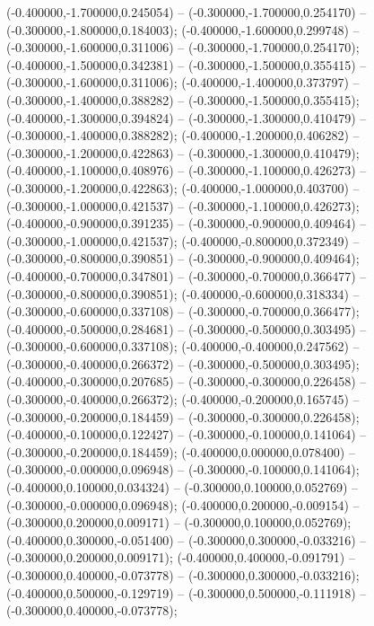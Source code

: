  (-0.400000,-1.700000,0.245054) -- (-0.300000,-1.700000,0.254170) -- (-0.300000,-1.800000,0.184003);
 (-0.400000,-1.600000,0.299748) -- (-0.300000,-1.600000,0.311006) -- (-0.300000,-1.700000,0.254170);
 (-0.400000,-1.500000,0.342381) -- (-0.300000,-1.500000,0.355415) -- (-0.300000,-1.600000,0.311006);
 (-0.400000,-1.400000,0.373797) -- (-0.300000,-1.400000,0.388282) -- (-0.300000,-1.500000,0.355415);
 (-0.400000,-1.300000,0.394824) -- (-0.300000,-1.300000,0.410479) -- (-0.300000,-1.400000,0.388282);
 (-0.400000,-1.200000,0.406282) -- (-0.300000,-1.200000,0.422863) -- (-0.300000,-1.300000,0.410479);
 (-0.400000,-1.100000,0.408976) -- (-0.300000,-1.100000,0.426273) -- (-0.300000,-1.200000,0.422863);
 (-0.400000,-1.000000,0.403700) -- (-0.300000,-1.000000,0.421537) -- (-0.300000,-1.100000,0.426273);
 (-0.400000,-0.900000,0.391235) -- (-0.300000,-0.900000,0.409464) -- (-0.300000,-1.000000,0.421537);
 (-0.400000,-0.800000,0.372349) -- (-0.300000,-0.800000,0.390851) -- (-0.300000,-0.900000,0.409464);
 (-0.400000,-0.700000,0.347801) -- (-0.300000,-0.700000,0.366477) -- (-0.300000,-0.800000,0.390851);
 (-0.400000,-0.600000,0.318334) -- (-0.300000,-0.600000,0.337108) -- (-0.300000,-0.700000,0.366477);
 (-0.400000,-0.500000,0.284681) -- (-0.300000,-0.500000,0.303495) -- (-0.300000,-0.600000,0.337108);
 (-0.400000,-0.400000,0.247562) -- (-0.300000,-0.400000,0.266372) -- (-0.300000,-0.500000,0.303495);
 (-0.400000,-0.300000,0.207685) -- (-0.300000,-0.300000,0.226458) -- (-0.300000,-0.400000,0.266372);
 (-0.400000,-0.200000,0.165745) -- (-0.300000,-0.200000,0.184459) -- (-0.300000,-0.300000,0.226458);
 (-0.400000,-0.100000,0.122427) -- (-0.300000,-0.100000,0.141064) -- (-0.300000,-0.200000,0.184459);
 (-0.400000,0.000000,0.078400) -- (-0.300000,-0.000000,0.096948) -- (-0.300000,-0.100000,0.141064);
 (-0.400000,0.100000,0.034324) -- (-0.300000,0.100000,0.052769) -- (-0.300000,-0.000000,0.096948);
 (-0.400000,0.200000,-0.009154) -- (-0.300000,0.200000,0.009171) -- (-0.300000,0.100000,0.052769);
 (-0.400000,0.300000,-0.051400) -- (-0.300000,0.300000,-0.033216) -- (-0.300000,0.200000,0.009171);
 (-0.400000,0.400000,-0.091791) -- (-0.300000,0.400000,-0.073778) -- (-0.300000,0.300000,-0.033216);
 (-0.400000,0.500000,-0.129719) -- (-0.300000,0.500000,-0.111918) -- (-0.300000,0.400000,-0.073778);
